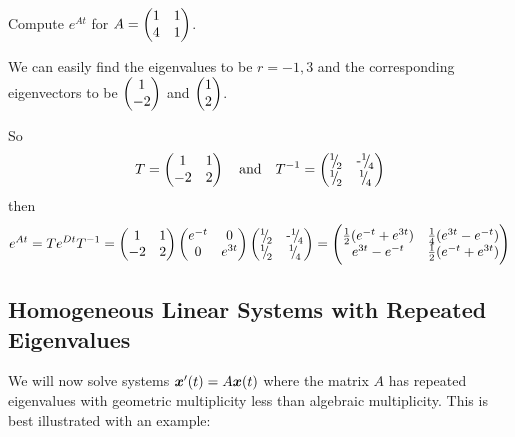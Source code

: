 \begin{eg}
	Compute $e^{At}$ for $A = \begin{pmatrix}1 & 1 \\ 4 & 1\end{pmatrix}$.
	
	We can easily find the eigenvalues to be $r=-1,3$ and the corresponding eigenvectors to be $\begin{pmatrix}1 \\ -2\end{pmatrix}$ and $\begin{pmatrix}1 \\ 2\end{pmatrix}$.
	
	So
	\[
	T = \begin{pmatrix}1 & 1 \\ -2 & 2\end{pmatrix} \quad \text{and} \quad T^{-1} = \begin{pmatrix}{}^{1}{\mskip -5mu/\mskip -3mu}_{2} & \text{-}{}^{1}{\mskip -5mu/\mskip -3mu}_{4} \\ {}^{1}{\mskip -5mu/\mskip -3mu}_{2} & {}^{1}{\mskip -5mu/\mskip -3mu}_{4}\end{pmatrix}
	\]
	then
	\[
	e^{At} = Te^{Dt}T^{-1} = \begin{pmatrix}1 & 1 \\ -2 & 2\end{pmatrix} \begin{pmatrix}e^{-t} & 0 \\ 0 & e^{3t}\end{pmatrix} \begin{pmatrix}{}^{1}{\mskip -5mu/\mskip -3mu}_{2} & \text{-}{}^{1}{\mskip -5mu/\mskip -3mu}_{4} \\ {}^{1}{\mskip -5mu/\mskip -3mu}_{2} & {}^{1}{\mskip -5mu/\mskip -3mu}_{4}\end{pmatrix} = \begin{pmatrix}\frac12(e^{-t}+e^{3t}) & \frac14(e^{3t}-e^{-t}) \\ e^{3t}-e^{-t} & \frac12(e^{-t}+e^{3t})\end{pmatrix}
	\]
\end{eg}


\subsection{Homogeneous Linear Systems with Repeated Eigenvalues}\label{sec:repeatedeigs}

We will now solve systems $\bm{x}'(t) = A\bm{x}(t)$ where the matrix $A$ has repeated eigenvalues with geometric multiplicity less than algebraic multiplicity. This is best illustrated with an example:


